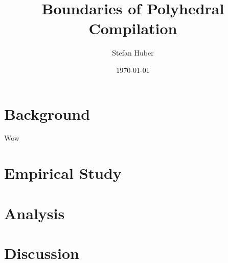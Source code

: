 \documentclass[xcolor=dvipsnames]{beamer}
\title[An Empirical Study]{Boundaries of Polyhedral Compilation}
\author{Stefan Huber}
\institute{
    Faculty of Computer Science and Mathematics\\
    University of Passau
}
\date{\today}
\begin{document}
\frame{\titlepage}

\section{Background}

\begin{frame}
    Wow
\end{frame}

\section{Empirical Study}

\section{Analysis}

\section{Discussion}
\end{document}
